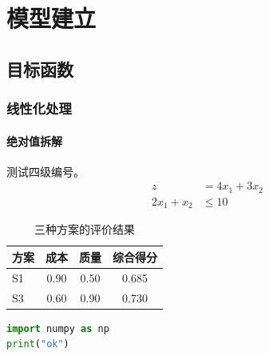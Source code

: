 \documentclass[UTF8,a4paper,zihao=-4]{ctexart}
\begin{document}
\section{模型建立}
\subsection{目标函数}
\subsubsection{线性化处理}
\paragraph{绝对值拆解} 测试四级编号。
\begin{align}
  z &= 4x_1 + 3x_2 \\
  2x_1 + x_2 &\le 10
\end{align}
\begin{table}[htbp]
\centering
\caption{三种方案的评价结果}
\begin{tabular}{lccc}
\toprule
方案 & 成本 & 质量 & 综合得分 \\
\midrule
S1 & 0.90 & 0.50 & 0.685 \\
S3 & 0.60 & 0.90 & 0.730 \\
\bottomrule
\end{tabular}
\end{table}
\begin{lstlisting}[language=Python]
import numpy as np
print("ok")
\end{lstlisting}
\end{document}
